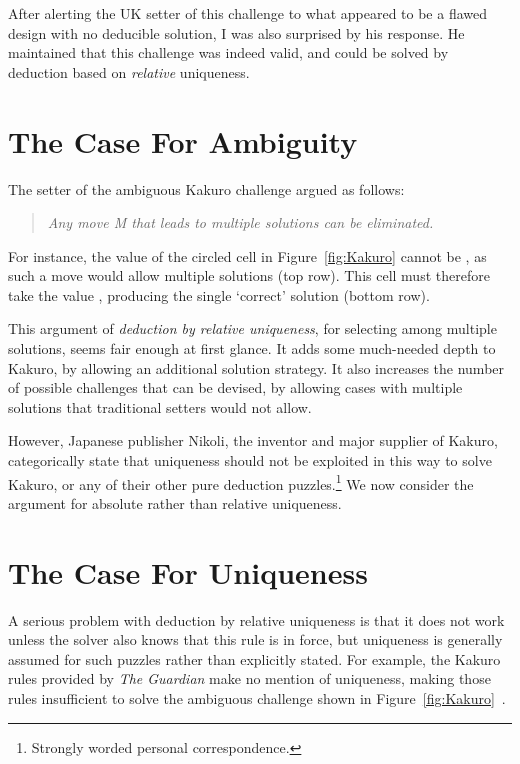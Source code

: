 \documentclass[12pt]{gapd}
\begin{document}
After alerting the UK setter of this challenge to what appeared to be
a flawed design with no deducible solution, I was also surprised by
his response.  He maintained that this challenge was indeed valid, and
could be solved by deduction based on \textit{relative} uniqueness.

\section{The Case For Ambiguity}
\label{sec:Ambiguity}

The setter of the ambiguous Kakuro challenge argued as follows:

\begin{quote}\itshape
  Any move M that leads to multiple solutions can be eliminated.
\end{quote}

For instance, the value of the circled cell in Figure~\ref{fig:Kakuro}
cannot be {}, as such a move would allow multiple solutions (top
row).  This cell must therefore take the value {}, producing the
single `correct' solution (bottom row).

This argument of \textit{deduction by relative uniqueness}, for selecting
among multiple solutions, seems fair enough at first glance.  It adds
some much-needed depth to Kakuro, by allowing an additional solution
strategy.  It also increases the number of possible challenges that
can be devised, by allowing cases with multiple solutions that
traditional setters would not allow.

However, Japanese publisher Nikoli, the inventor and major supplier of
Kakuro, categorically state that uniqueness should not be exploited in
this way to solve Kakuro, or any of their other pure deduction
puzzles.\footnote{Strongly worded personal correspondence.}  We now
consider the argument for absolute rather than relative uniqueness.

\section{The Case For Uniqueness}
\label{sec:Uniqueness}

A serious problem with deduction by relative uniqueness is that it
does not work unless the solver also knows that this rule is in force,
but uniqueness is generally assumed for such puzzles rather than
explicitly stated.  For example, the Kakuro rules provided by \textit{The
  Guardian} make no mention of uniqueness, making those rules
insufficient to solve the ambiguous challenge shown in
Figure~\ref{fig:Kakuro}~\cite{guardian}.
\end{document}

